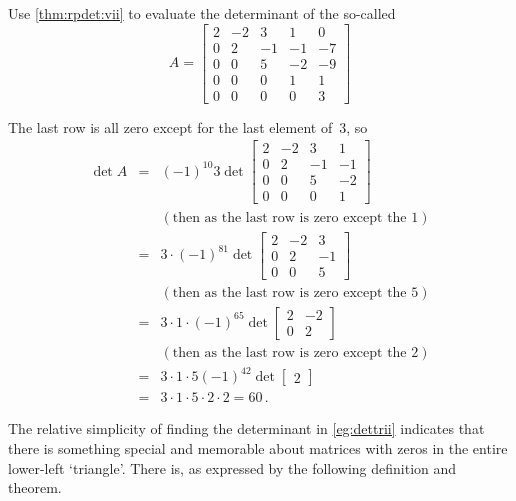 \begin{example} \label{eg:dettrii}
Use \autoref{thm:rpdet:vii} to evaluate the determinant of the  so-called   
\begin{equation*}
A=\begin{bmatrix}2&-2&3&1&0
\\0&2&-1&-1&-7
\\0&0&5&-2&-9
\\0&0&0&1&1
\\0&0&0&0&3 \end{bmatrix}
\end{equation*}
\begin{solution} 
The last row is all zero except for the last element of~\(3\), so
\begin{eqnarray*}
\det A&=&(-1)^{10}3\det\begin{bmatrix}2&-2&3&1
\\0&2&-1&-1
\\0&0&5&-2
\\0&0&0&1\end{bmatrix}
\\&&(\text{then as the last row is zero except the~\(1\)})
\\&=&3\cdot (-1)^81\det\begin{bmatrix}2&-2&3
\\0&2&-1
\\0&0&5\end{bmatrix}
\\&&(\text{then as the last row is zero except the~\(5\)})
\\&=&3\cdot1\cdot(-1)^65\det\begin{bmatrix}2&-2
\\0&2\end{bmatrix}
\\&&(\text{then as the last row is zero except the~\(2\)})
\\&=&3\cdot1\cdot5(-1)^42\det\begin{bmatrix}2\end{bmatrix}
\\&=&3\cdot1\cdot5\cdot2\cdot2=60\,.
\end{eqnarray*}
\end{solution}
\end{example}


The relative simplicity of finding the determinant in \autoref{eg:dettrii} indicates that there is something special and memorable about matrices with zeros in the entire lower-left `triangle'.
There is, as expressed by the following definition and theorem.






